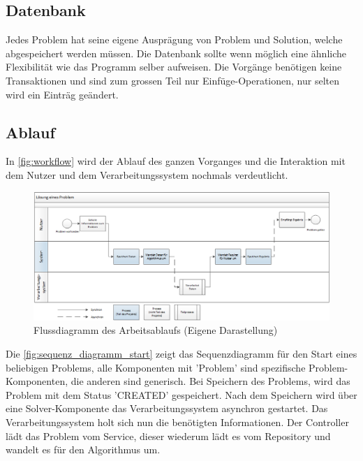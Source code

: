 \subsection{Datenbank}
Jedes Problem hat seine eigene Ausprägung von Problem und Solution, welche abgespeichert werden müssen. Die Datenbank sollte wenn möglich eine ähnliche Flexibilität wie das Programm selber aufweisen. Die Vorgänge benötigen keine Transaktionen und sind zum grossen Teil nur Einfüge-Operationen, nur selten wird ein Einträg geändert.

\begin{landscape}
\subsection{Ablauf}
\thispagestyle{empty}
In \autoref{fig:workflow} wird der Ablauf des ganzen Vorganges und die Interaktion mit dem Nutzer und dem Verarbeitungssystem nochmals verdeutlicht.

\begin{figure}[h]
\centering
\includegraphics[scale=0.8]{images/visio/workflow.png}
\caption{Flussdiagramm des Arbeitsablaufs (Eigene Darastellung)}
\label{fig:workflow}
\end{figure}

\end{landscape}


Die \autoref{fig:sequenz_diagramm_start} zeigt das Sequenzdiagramm für den Start eines beliebigen Problems, alle Komponenten mit '{Problem}' sind spezifische Problem-Komponenten, die anderen sind generisch. Bei Speichern des Problems, wird das Problem mit dem Status 'CREATED' gespeichert. Nach dem Speichern wird über eine Solver-Komponente das Verarbeitungssystem asynchron gestartet. Das Verarbeitungssystem holt sich nun die benötigten Informationen. Der Controller lädt das Problem vom Service, dieser wiederum lädt es vom Repository und wandelt es für den Algorithmus um.

